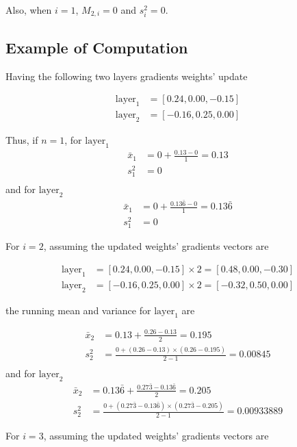 \documentclass[10pt, a4paper]{article}
\begin{document}
	Also, when $i = 1$, $M_{2, i} = 0$ and $s^2_{i} = 0$.
	
	\subsection*{Example of Computation}
	Having the following two layers gradients weights' update
	
	\begin{align*}
	\text{layer}_1 &= [ 0.24, 0.00, -0.15] \\
	\text{layer}_2 &= [-0.16, 0.25, 0.00]
	\end{align*}
	
	Thus, if $n = 1$, for $\text{layer}_1$
	\begin{align*}
	\bar{x}_{1} &= 0 + \frac{0.13 - 0}{1} = 0.13 \\
	s^2_{1} &= 0 \\
	\end{align*}
	and for $\text{layer}_2$
	\begin{align*}
	\bar{x}_{1} &= 0 + \frac{0.13\bar{6} - 0}{1} = 0.13\bar{6}  \\
	s^2_{1} &= 0
	\end{align*}
	
	For $i=2$, assuming the updated weights' gradients vectors are
	
	\begin{align*}
	\text{layer}_1 &= [ 0.24, 0.00, -0.15] \times 2 = [ 0.48, 0.00, -0.30] \\
	\text{layer}_2 &= [-0.16, 0.25, 0.00] \times 2 = [-0.32, 0.50, 0.00]
	\end{align*}
	
	the running mean and variance for $\text{layer}_1$ are
	
	\begin{align*}
	\bar{x}_{2} &= 0.13 + \frac{0.26 - 0.13}{2} = 0.195 \\
	s^2_{2} &= \frac{0 + (0.26 - 0.13)\times(0.26 - 0.195)}{2 - 1} = 0.00845\\
	\end{align*}
	and for $\text{layer}_2$
	\begin{align*}
	\bar{x}_{2} &= 0.13\bar{6} + \frac{0.27\bar{3} - 0.13\bar{6}}{2} =  0.205\\
	s^2_{2} &= \frac{0 + (0.27\bar{3} - 0.13\bar{6})\times(0.27\bar{3} - 0.205)}{2 - 1} = 0.00933889
	\end{align*}
	
	For $i=3$, assuming the updated weights' gradients vectors are
	
\end{document}
